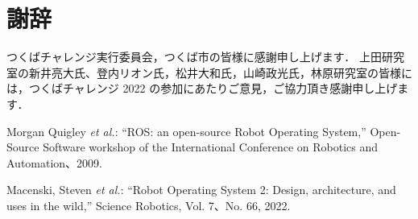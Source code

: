 \documentclass[twocolumn,9pt]{jsproceedings}
\begin{document}
\section*{謝辞}
つくばチャレンジ実行委員会，つくば市の皆様に感謝申し上げます．
上田研究室の新井亮大氏、登内リオン氏，松井大和氏，山崎政光氏，林原研究室の皆様には，つくばチャレンジ 2022 の参加にあたりご意見，ご協力頂き感謝申し上げます．

\footnotesize
\begin{thebibliography}{99}
  Morgan Quigley {\it et al.}: ``ROS: an open-source Robot Operating System,''
  Open-Source Software workshop of the International Conference on Robotics and Automation、2009.

  Macenski, Steven {\it et al.}: ``Robot Operating System 2: Design, architecture, and uses in the wild,''
  Science Robotics, Vol. 7、No. 66, 2022.










\end{thebibliography}
\end{document}

